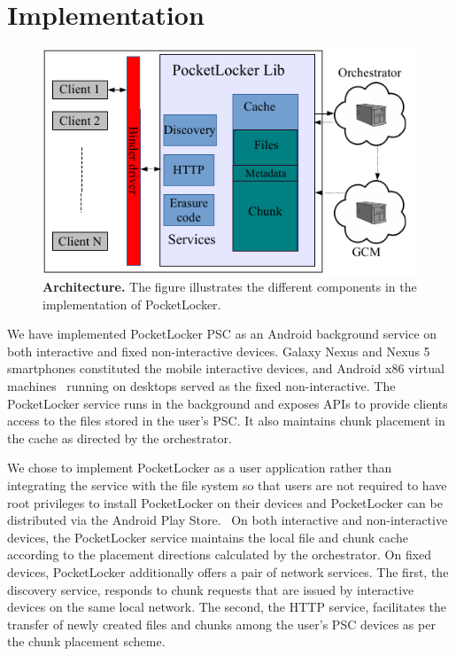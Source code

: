 
\section{Implementation}
\label{sec-implementation}

\begin{figure}[t]

\includegraphics[width=\columnwidth]{./figures/implementation.pdf}

\caption{\small \textbf{Architecture.} The figure illustrates the different
  components in the implementation of PocketLocker.}

\label{fig-implementation}
  \vspace*{-0.2in}

\end{figure}

We have implemented PocketLocker PSC as an Android background service on both
interactive and fixed non-interactive devices. Galaxy Nexus and Nexus 5
smartphones constituted the mobile interactive devices, and Android x86
virtual machines~\cite{androidx86} running on desktops served as the fixed
non-interactive. The PocketLocker service runs in the background and exposes
APIs to provide clients access to the files stored in the user's PSC. It also
maintains chunk placement in the cache as directed by the orchestrator. 

We chose to implement PocketLocker as a user application rather than
integrating the service with the file system so that users are not required
to have root privileges to install PocketLocker on their devices and
PocketLocker can be distributed via the Android Play Store.~\cite{playstore}
On both interactive and non-interactive devices, the PocketLocker service
maintains the local file and chunk cache according to the placement
directions calculated by the orchestrator. On fixed devices, PocketLocker
additionally offers a pair of network services. The first, the discovery
service, responds to chunk requests that are issued by interactive devices on
the same local network. The second, the HTTP service, facilitates the
transfer of newly created files and chunks among the user's PSC devices as
per the chunk placement scheme.

